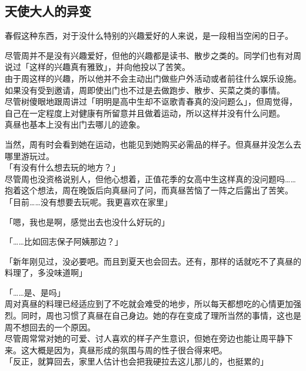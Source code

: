 \subsection{天使大人的异变}

春假这种东西，对于没什么特别的兴趣爱好的人来说，是一段相当空闲的日子。

尽管周并不是没有兴趣爱好，但他的兴趣都是读书、散步之类的。同学们也有对周说过「这样的兴趣真有雅致」，并向他投以了苦笑。\\

由于周这样的兴趣，所以他并不会主动出门做些户外活动或者前往什么娱乐设施。如果没有受到邀请，周即使出门也不过是去做跑步、散步、买菜之类的事情。\\

尽管树傻眼地跟周讲过「明明是高中生却不讴歌青春真的没问题么」，但周觉得，自己在一定程度上对健康有所留意并且做着运动，所以这样并没有什么问题。\\

真昼也基本上没有出门去哪儿的迹象。

当然，周有时会看到她在运动，也能见到她购买必需品的样子。但真昼并没怎么去哪里游玩过。\\

「有没有什么想去玩的地方？」\\

尽管周也没资格说别人，但他心想着，正值花季的女高中生这样真的没问题吗……抱着这个想法，周在晚饭后向真昼问了问，而真昼苦恼了一阵之后露出了苦笑。\\

「目前……没有想要去玩呢。我更喜欢在家里」

「嗯，我也是啊，感觉出去也没什么好玩的」

「……比如回志保子阿姨那边？」

「新年刚见过，没必要吧。而且到夏天也会回去。还有，那样的话就吃不了真昼的料理了，多没味道啊」

「……是、是吗」\\

周对真昼的料理已经适应到了不吃就会难受的地步，所以每天都想吃的心情更加强烈。同时，周也习惯了真昼在自己身边。她的存在变成了理所当然的事情，这也是周不想回去的一个原因。\\

尽管周常常对她的可爱、讨人喜欢的样子产生意识，但她在旁边也能让周平静下来。这大概是因为，真昼形成的氛围与周的性子很合得来吧。\\

「反正，就算回去，家里人估计也会把我硬拉去这儿那儿的，也挺累的」

